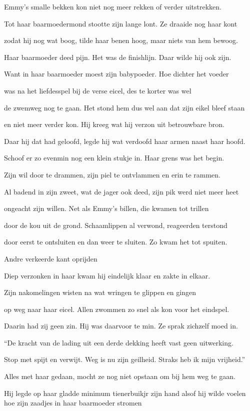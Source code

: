 Emmy’s smalle bekken
kon niet nog meer rekken
of verder uitstrekken.

Tot haar baarmoedermond
stootte zijn lange lont.
Ze draaide nog haar kont

zodat hij nog wat boog,
tilde haar benen hoog,
maar niets van hem bewoog.

Haar baarmoeder deed pijn.
Het was de finishlijn.
Daar wilde hij ook zijn.

Want in haar baarmoeder
moest zijn babypoeder.
Hoe dichter het voeder

was na het liefdesspel
bij de verse eicel,
des te korter was wel

de zwemweg nog te gaan.
Het stond hem dus wel aan
dat zijn eikel bleef staan

en niet meer verder kon.
Hij kreeg wat hij verzon
uit betrouwbare bron.

Daar hij dat had geloofd,
legde hij wat verdoofd
haar armen naast haar hoofd.

Schoof er zo evenmin
nog een klein stukje in.
Haar grens was het begin.

Zijn wil door te drammen,
zijn piel te ontvlammen
en erin te rammen.

Al badend in zijn zweet,
wat de jager ook deed,
zijn pik werd niet meer heet

ongeacht zijn willen.
Net als Emmy’s billen,
die kwamen tot trillen

door de kou uit de grond.
Schaamlippen al verwond,
reageerden terstond

door eerst te ontsluiten
en dan weer te sluiten.
Zo kwam het tot spuiten.

Andre verkeerde kant oprijden

Diep verzonken in haar
kwam hij eindelijk klaar
en zakte in elkaar.

Zijn nakomelingen
wisten na wat wringen
te glippen en gingen

op weg naar haar eicel.
Allen zwommen zo snel
als kon voor het eindspel.

Daarin had zij geen zin.
Hij was daarvoor te min.
Ze sprak zichzelf moed in.

“De kracht van de lading
uit een derde dekking
heeft vast geen uitwerking.

Stop met spijt en verwijt.
Weg is nu zijn geilheid.
Straks heb ik mijn vrijheid.”

Alles met haar gedaan,
mocht ze nog niet opstaan
om bij hem weg te gaan.

Hij legde op haar gladde minimum tienerbuikjr zijn hand alsof hij wilde voelen hoe zijn zaadjes in haar baarmoeder stromen

